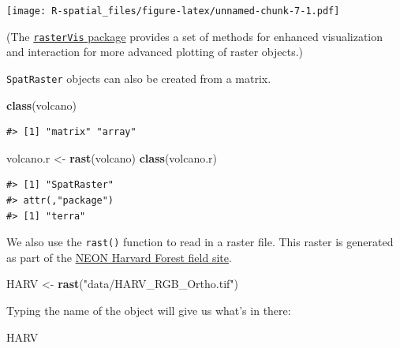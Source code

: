 \documentclass[
]{book}
\newenvironment{Shaded}{\begin{snugshade}}{\end{snugshade}}
\newcommand{\FunctionTok}[1]{\textcolor[rgb]{0.13,0.29,0.53}{\textbf{#1}}}
\newcommand{\NormalTok}[1]{#1}
\newcommand{\OtherTok}[1]{\textcolor[rgb]{0.56,0.35,0.01}{#1}}
\newcommand{\StringTok}[1]{\textcolor[rgb]{0.31,0.60,0.02}{#1}}
\begin{document}
\texttt{[image: R-spatial\_files/figure-latex/unnamed-chunk-7-1.pdf]}

(The \href{https://cran.r-project.org/web/packages/rasterVis/index.html}{\texttt{rasterVis} package} provides a set of methods for enhanced visualization and interaction for more advanced plotting of raster objects.)

\texttt{SpatRaster} objects can also be created from a matrix.

\begin{Shaded}
\begin{Highlighting}[]
\FunctionTok{class}\NormalTok{(volcano)}
\end{Highlighting}
\end{Shaded}

\begin{verbatim}
#> [1] "matrix" "array"
\end{verbatim}

\begin{Shaded}
\begin{Highlighting}[]
\NormalTok{volcano.r }\OtherTok{\textless{}{-}} \FunctionTok{rast}\NormalTok{(volcano)}
\FunctionTok{class}\NormalTok{(volcano.r)}
\end{Highlighting}
\end{Shaded}

\begin{verbatim}
#> [1] "SpatRaster"
#> attr(,"package")
#> [1] "terra"
\end{verbatim}

We also use the \texttt{rast()} function to read in a raster file. This raster is generated as part of the \href{https://www.neonscience.org/field-sites/field-sites-map/HARV}{NEON Harvard Forest field site}.

\begin{Shaded}
\begin{Highlighting}[]
\NormalTok{HARV }\OtherTok{\textless{}{-}} \FunctionTok{rast}\NormalTok{(}\StringTok{"data/HARV\_RGB\_Ortho.tif"}\NormalTok{)}
\end{Highlighting}
\end{Shaded}

Typing the name of the object will give us what's in there:

\begin{Shaded}
\begin{Highlighting}[]
\NormalTok{HARV}
\end{Highlighting}
\end{Shaded}
\end{document}
